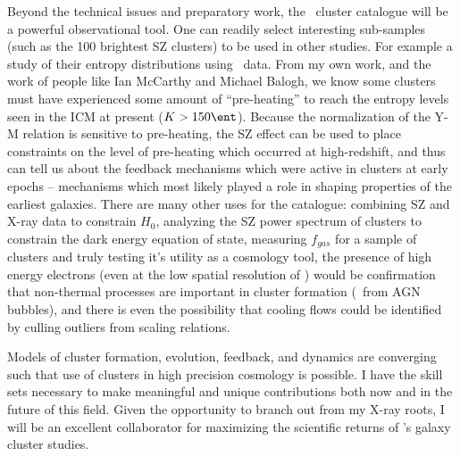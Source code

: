 \documentclass[11pt]{article}
\begin{document}
Beyond the technical issues and preparatory work, the \Planck\ cluster
catalogue will be a powerful observational tool. One can readily
select interesting sub-samples (such as the 100 brightest SZ clusters)
to be used in other studies. For example a study of their entropy
distributions using \Chandra\ data. From my own work, and the work of people
like Ian McCarthy and Michael Balogh, we know some clusters must have
experienced some amount of ``pre-heating'' to reach the entropy levels
seen in the ICM at present ($K > 150 \ent$). Because the normalization
of the Y-M relation is sensitive to pre-heating, the SZ effect can
be used to place constraints on the level of pre-heating which
occurred at high-redshift, and thus can tell us about the feedback
mechanisms which were active in clusters at early epochs -- mechanisms
which most likely played a role in shaping properties of the earliest
galaxies. There are many other uses for the catalogue: combining SZ
and X-ray data to constrain $H_0$, analyzing the SZ power spectrum of
clusters to constrain the dark energy equation of state, measuring
$f_{gas}$ for a sample of clusters and truly testing it's utility as a
cosmology tool, the presence of high energy electrons (even at the low
spatial resolution of \Planck) would be confirmation that non-thermal
processes are important in cluster formation (\eg\ from AGN bubbles),
and there is even the possibility that cooling flows could be
identified by culling outliers from scaling relations.

Models of cluster formation, evolution, feedback, and dynamics are
converging such that use of clusters in high precision cosmology is
possible. I have the skill sets necessary to make meaningful and
unique contributions both now and in the future of this field. Given
the opportunity to branch out from my X-ray roots, I will be an
excellent collaborator for maximizing the scientific returns of
\Planck's galaxy cluster studies.
\end{document}
